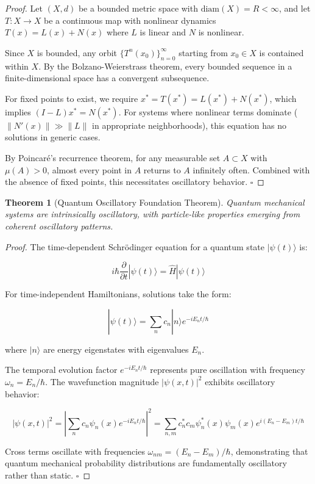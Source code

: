 \documentclass[11pt]{article}
\newtheorem{theorem}{Theorem}[section]
\theoremstyle{remark}
\begin{document}
\begin{proof}
Let $(X, d)$ be a bounded metric space with $\text{diam}(X) = R < \infty$, and let $T: X \to X$ be a continuous map with nonlinear dynamics $T(x) = L(x) + N(x)$ where $L$ is linear and $N$ is nonlinear.

Since $X$ is bounded, any orbit $\{T^n(x_0)\}_{n=0}^{\infty}$ starting from $x_0 \in X$ is contained within $X$. By the Bolzano-Weierstrass theorem, every bounded sequence in a finite-dimensional space has a convergent subsequence.

For fixed points to exist, we require $x^* = T(x^*) = L(x^*) + N(x^*)$, which implies $(I - L)x^* = N(x^*)$. For systems where nonlinear terms dominate ($\|N'(x)\| \gg \|L\|$ in appropriate neighborhoods), this equation has no solutions in generic cases.

By Poincaré's recurrence theorem, for any measurable set $A \subset X$ with $\mu(A) > 0$, almost every point in $A$ returns to $A$ infinitely often. Combined with the absence of fixed points, this necessitates oscillatory behavior. $\square$
\end{proof}

\begin{theorem}[Quantum Oscillatory Foundation Theorem]
Quantum mechanical systems are intrinsically oscillatory, with particle-like properties emerging from coherent oscillatory patterns.
\end{theorem}

\begin{proof}
The time-dependent Schrödinger equation for a quantum state $|\psi(t)\rangle$ is:

$$i\hbar \frac{\partial}{\partial t}|\psi(t)\rangle = \hat{H}|\psi(t)\rangle$$

For time-independent Hamiltonians, solutions take the form:

$$|\psi(t)\rangle = \sum_n c_n |n\rangle e^{-iE_n t/\hbar}$$

where $|n\rangle$ are energy eigenstates with eigenvalues $E_n$.

The temporal evolution factor $e^{-iE_n t/\hbar}$ represents pure oscillation with frequency $\omega_n = E_n/\hbar$. The wavefunction magnitude $|\psi(x,t)|^2$ exhibits oscillatory behavior:

$$|\psi(x,t)|^2 = \left|\sum_n c_n \psi_n(x) e^{-iE_n t/\hbar}\right|^2 = \sum_{n,m} c_n^* c_m \psi_n^*(x) \psi_m(x) e^{i(E_n - E_m)t/\hbar}$$

Cross terms oscillate with frequencies $\omega_{nm} = (E_n - E_m)/\hbar$, demonstrating that quantum mechanical probability distributions are fundamentally oscillatory rather than static. $\square$
\end{proof}
\end{document}
